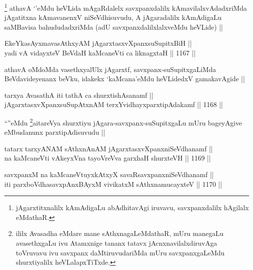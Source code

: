 \begin{artha}
\footnote{jAgarxtitxnalilx kAmAdigaLu abAdhitavAgi iruvavu, savxpanxdalilx hAgilalx eMdathaR.}
athavA `\stext'eMdu heVLida mAgaRdalelx savxpanxdalilx kAmavilalxvAdadxriMda jAgatitxna kAmavanenxV niSeVdhisuvudu, A jAgaradalilx kAmAdigaLu saMBavisa bahududadxriMda (adU savxpanxdalilxlalxveMdu heVLide) ||
\end{artha}


\begin{shl}
EkeYkasAyxmavasAthxyAM jAgarxtasxvXpanxsuSupitxBiH || \\
yadi vA vidayxteV BeVdaH kaMcaneVti ca liknagxtaH ||  1167 ||  
\end{shl}

\begin{artha}
athavA oMdoMda vasethxyalUlx jAgarxtf, savxpanx-suSupitxgaLiMda BeVdavideyenanx beVku, idakekx `kaMcana'eMdu heVLidedxV gamakavAgide ||
\end{artha}


\begin{shl}
tarxya AvasathA iti tathA ca shurxtishAsanamf || \\
jAgarxtasxvXpanxsuSupAtxnAM terxYvidhayxparxtipAdakamf ||  1168 || 
\end{shl}

\begin{artha}
``\stext''eMdu \footnote{ililx Avasadha eMdare mane sAthxnagaLeMdathaR, mUru manegaLu avasethxgaLu ivu Atamxnige tananx tatavx jAcnxnavilalxdiruvAga toVruvavu ivu savxpanx daMtiruvudariMda mUru savxpanxgaLeMdu shurxtiyalilx heVLalapxTiTxde.}aitareVya shurxtiyu jAgara-savxpanx-suSupitxgaLu mUru bageyAgive eMbudanunx parxtipAdisuvudu ||
\end{artha}


\begin{shl}
tatarx tarxyANAM sAthxnAnAM jAgarxtasxvXpanxniSeVdhanamf || \\
na kaMcaneVti vAkeyxVna tayoVreVva garxhaH shurxteVH ||  1169 ||  
\end{shl}
				
\begin{shl}
savxpanxM na kaMcaneVtuyxkAtxyX savaRsavxpanxniSeVdhanamf || \\
iti parxboVdhasavxpAnxBAyxM vivikatxM sAthxnamucayxteV ||  1170 ||  
\end{shl}

